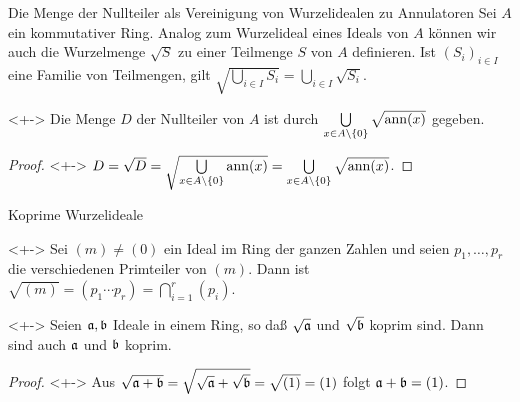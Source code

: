 \begin{frame}{Die Menge der Nullteiler als Vereinigung von Wurzelidealen zu
Annulatoren}
    Sei \(A\) ein kommutativer Ring. Analog zum Wurzelideal eines Ideals von
    \(A\) können wir auch die Wurzelmenge \(\sqrt S\) zu einer Teilmenge \(S\)
    von \(A\) definieren. Ist \((S_i)_{i \in I}\) eine Familie von Teilmengen,
    gilt \(\sqrt{\bigcup\limits_{i \in I} S_i} = \bigcup\limits_{i \in I}
    \sqrt{S_i}\).
    \begin{proposition}<+->
        Die Menge \(D\) der Nullteiler von \(A\) ist durch
        \(\bigcup\limits_{x \in A \setminus \{0\}} \sqrt{\operatorname{ann} (x)}\)
        gegeben.
    \end{proposition}
    \begin{proof}<+->
        \(D = \sqrt{D} = \sqrt{\bigcup\limits_{x \in A \setminus \{0\}}
        \operatorname{ann} (x)} = \bigcup\limits_{x \in A \setminus \{0\}} \sqrt{\operatorname{ann} (x)}\).
    \end{proof}
\end{frame}

\begin{frame}{Koprime Wurzelideale}
    \begin{example}<+->
        Sei \((m) \neq (0)\) ein Ideal im Ring der ganzen Zahlen und seien
        \(p_1, \dotsc, p_r\) die verschiedenen Primteiler von \((m)\). Dann ist
        \(\sqrt{(m)} = (p_1 \dotsm p_r) = \bigcap\limits_{i = 1}^r (p_i)\).
    \end{example}
    \begin{proposition}<+->
        Seien \(\mathfrak{a}, \mathfrak{b}\) Ideale in einem Ring, so daß
        \(\sqrt\ideal a\) und \(\sqrt \ideal b\) koprim sind. Dann sind auch
        \(\mathfrak{a}\) und \(\mathfrak{b}\) koprim.
    \end{proposition}
    \begin{proof}<+->
        Aus \(\sqrt{\mathfrak{a} + \mathfrak{b}} = \sqrt{\sqrt{\mathfrak{a}}
        + \sqrt{\mathfrak{b}}} = \sqrt{(1)} = (1)\) folgt \(\mathfrak{a} + \mathfrak{b}
        = (1)\).
    \end{proof}
\end{frame}

